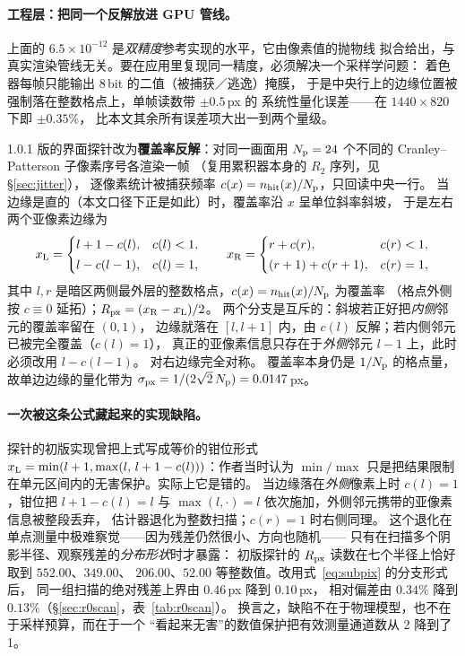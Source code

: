 \paragraph{工程层：把同一个反解放进 GPU 管线。}
上面的 $6.5\times10^{-12}$ 是\emph{双精度}参考实现的水平，它由像素值的抛物线
拟合给出，与真实渲染管线无关。要在应用里复现同一精度，必须解决一个采样学问题：
着色器每帧只能输出 8\,bit 的二值（被捕获／逃逸）掩膜，
于是中央行上的边缘位置被强制落在整数格点上，单帧读数带 $\pm0.5$\,px 的
系统性量化误差——在 $1440\times820$ 下即 $\pm0.35\%$，
比本文其余所有误差项大出一到两个量级。

1.0.1 版的界面探针改为\textbf{覆盖率反解}：对同一画面用
$N_{\rm p}=24$ 个不同的 Cranley--Patterson 子像素序号各渲染一帧
（复用累积器本身的 $R_2$ 序列，见 \S\ref{sec:jitter}），
逐像素统计被捕获频率 $c(x)=n_{\rm hit}(x)/N_{\rm p}$，只回读中央一行。
当边缘是直的（本文口径下正是如此）时，覆盖率沿 $x$ 呈单位斜率斜坡，
于是左右两个亚像素边缘为
\begin{equation}
x_{\rm L}=
\begin{cases}
l+1-c(l), & c(l)<1,\\[2pt]
l-c(l-1), & c(l)=1,
\end{cases}
\qquad
x_{\rm R}=
\begin{cases}
r+c(r), & c(r)<1,\\[2pt]
(r+1)+c(r+1), & c(r)=1,
\end{cases}
\label{eq:subpix}
\end{equation}
其中 $l,r$ 是暗区两侧最外层的整数格点，$c(x)=n_{\rm hit}(x)/N_{\rm p}$ 为覆盖率
（格点外侧按 $c\equiv0$ 延拓）；$R_{\rm px}=(x_{\rm R}-x_{\rm L})/2$。
两个分支是互斥的：斜坡若正好把\emph{内侧}邻元的覆盖率留在 $(0,1)$，
边缘就落在 $[l,l+1]$ 内，由 $c(l)$ 反解；若内侧邻元已被完全覆盖（$c(l)=1$），
真正的亚像素信息只存在于\emph{外侧}邻元 $l-1$ 上，此时必须改用 $l-c(l-1)$。
对右边缘完全对称。
覆盖率本身仍是 $1/N_{\rm p}$ 的格点量，故单边边缘的量化带为
$\sigma_{\rm px}=1/(2\sqrt2\,N_{\rm p})=0.0147$\,px。

\paragraph{一次被这条公式藏起来的实现缺陷。}
探针的初版实现曾把上式写成等价的钳位形式
$x_{\rm L}=\min(l+1,\max(l,\,l+1-c(l)))$：作者当时认为
$\min/\max$ 只是把结果限制在单元区间内的无害保护。实际上它是错的。
当边缘落在\emph{外侧}像素上时 $c(l)=1$，钳位把 $l+1-c(l)=l$ 与
$\max(l,\cdot)=l$ 依次施加，外侧邻元携带的亚像素信息被整段丢弃，
估计器退化为整数扫描；$c(r)=1$ 时右侧同理。
这个退化在单点测量中极难察觉——因为残差仍然很小、方向也随机——
只有在扫描多个阴影半径、观察残差的\emph{分布形状}时才暴露：
初版探针的 $R_{\rm px}$ 读数在七个半径上恰好取到 $552.00$、$349.00$、
$206.00$、$52.00$ 等整数值。改用式~\eqref{eq:subpix} 的分支形式后，
同一组扫描的绝对残差上界由 $0.46$\,px 降到 $0.10$\,px，
相对偏差由 $0.34\%$ 降到 $0.13\%$（\S\ref{sec:r0scan}，表~\ref{tab:r0scan}）。
换言之，缺陷不在于物理模型，也不在于采样预算，而在于一个
“看起来无害”的数值保护把有效测量通道数从 2 降到了 1。

